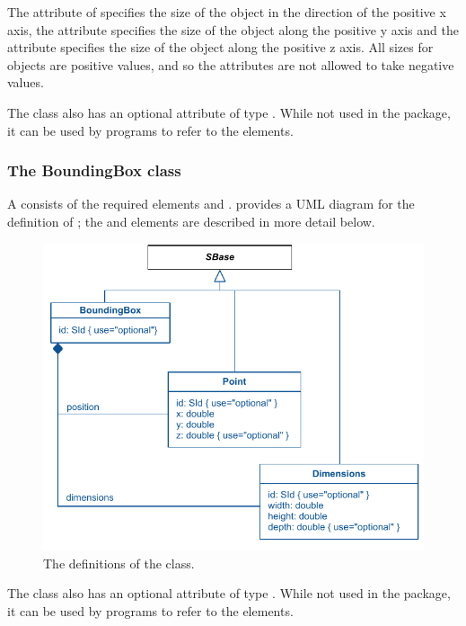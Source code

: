 The  attribute of \Dimensions specifies the size of the object in the direction of 
the positive x axis, the  attribute specifies the size of 
the object along the positive y axis and the  attribute 
specifies the size of the object along the positive z axis. All sizes 
for \Dimensions objects are positive values, and so the attributes are 
not allowed to take negative values. 

The \Dimensions class also has an optional attribute  of type 
. While not used in the \Layout package, it can be used 
by programs to refer to the elements. 


\subsubsection{The BoundingBox class} \label{boundingbox-class} A 
\BoundingBox consists of the required elements  and
.   provides a UML diagram for
the definition of \BoundingBox; the  and 
elements are described in more detail below.

\begin{figure}[bth]
\includegraphics{uml/layout-boundingbox-uml}
\caption{The definitions of the \BoundingBox class.}
\label{uml:boundingbox}
\end{figure}

The \BoundingBox class also has an optional attribute  of type 
. While not used in the \Layout package, it can be used 
by programs to refer to the elements. 


